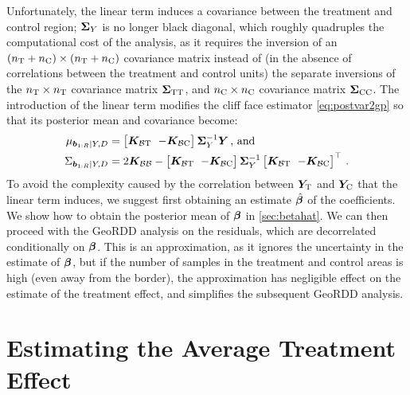 \documentclass[12pt]{article}
\begin{document}
Unfortunately, the linear term induces a covariance between the treatment and control region; \(\bm{\Sigma}_Y\) is no longer black diagonal, which roughly quadruples the computational cost of the analysis, as it requires the inversion of an \((n_{\mathrm{T}}{}+n_{\mathrm{C}}{}) \times (n_{\mathrm{T}}{}+n_{\mathrm{C}}{})\) covariance matrix instead of (in the absence of correlations between the treatment and control units) the separate inversions of the \(n_{\mathrm{T}}{} \times n_{\mathrm{T}}{}\) covariance matrix \(\bm{\Sigma}_{\mathrm{T} \mathrm{T}}\), and \(n_{\mathrm{C}}{} \times n_{\mathrm{C}}{}\) covariance matrix \(\bm{\Sigma}_{\mathrm{C} \mathrm{C}}\).
The introduction of the linear term modifies the cliff face estimator \autoref{eq:postvar2gp} so that its posterior mean and covariance become:
\begin{equation}
    \begin{split}
        \mu_{\sentinels \mid Y, D} &= 
        \begingroup\SmallColSep
        \begin{bmatrix}
            \KBT & -\KBC
        \end{bmatrix}
        \SigmaMat_Y^{-1}
        \Yvec
        \endgroup
        \,\text{, and}\\
        \Sigma_{\sentinels \mid Y, D} &=
        \begingroup\SmallColSep
        2 \KBB -
        \begin{bmatrix}
            \KBT & -\KBC
        \end{bmatrix}
        \SigmaMat_Y^{-1}
        \begin{bmatrix}
            \KBT & -\KBC
        \end{bmatrix}\trans
        \endgroup
        \,.
    \end{split}
    \label{eq:cliff_with_covariates}
\end{equation}
To avoid the complexity caused by the correlation between \(\bm{Y}_{\mathrm{T}}\) and \(\bm{Y}_{\mathrm{C}}\) that the linear term induces, we suggest first obtaining an estimate \(\hat{\bm{\beta}}\) of the coefficients.
We show how to obtain the posterior mean of \(\bm{\beta}\) in \autoref{sec:betahat}.
We can then proceed with the GeoRDD analysis on the residuals, which are decorrelated conditionally on \(\bm{\beta}\).
This is an approximation, as it ignores the uncertainty in the estimate of \(\bm{\beta}\), but if the number of samples in the treatment and control areas is high (even away from the border), the approximation has negligible effect on the estimate of the treatment effect, and simplifies the subsequent GeoRDD analysis.

\section{Estimating the Average Treatment Effect}
\label{sec:ate}
\end{document}
